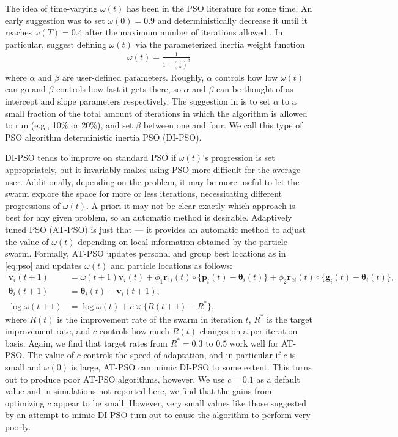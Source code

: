 \documentclass[12pt]{article}
\begin{document}
The idea of time-varying $\omega(t)$ has been in the PSO literature for some time. An early suggestion was to set $\omega(0)=0.9$ and deterministically decrease it until it reaches $\omega(T)=0.4$ after the maximum number of iterations allowed \citep{eberhart2000comparing}. In particular, \citet{tuppadung2011comparing} suggest defining $\omega(t)$ via the parameterized inertia weight function
\begin{align}\label{eq:inertiafun}
\omega(t) = \frac{1}{1 + \left(\frac{t}{\alpha}\right)^{\beta}}
\end{align}
where $\alpha$ and $\beta$ are user-defined parameters. Roughly, $\alpha$ controls how low $\omega(t)$ can go and $\beta$ controls how fast it gets there, so $\alpha$ and $\beta$ can be thought of as intercept and slope parameters respectively. The suggestion in \citet{tuppadung2011comparing} is to set $\alpha$ to a small fraction of the total amount of iterations in which the algorithm is allowed to run (e.g., 10\% or 20\%), and set $\beta$ between one and four. We call this type of PSO algorithm deterministic inertia PSO (DI-PSO).

DI-PSO tends to improve on standard PSO if $\omega(t)$'s progression is set appropriately, but it invariably makes using PSO more difficult for the average user. Additionally, depending on the problem, it may be more useful to let the swarm explore the space for more or less iterations, necessitating different progressions of $\omega(t)$. A priori it may not be clear exactly which approach is best for any given problem, so an automatic method is desirable. Adaptively tuned PSO (AT-PSO) is just that --- it provides an automatic method to adjust the value of $\omega(t)$ depending on local information obtained by the particle swarm. Formally, AT-PSO updates personal and group best locations as in \eqref{eq:pso} and updates $\omega(t)$ and particle locations as follows:
\begin{align}\label{eq:atpso}
\bm{v}_i(t+1) &= \omega(t+1) \bm{v}_i(t) + \phi_1 \bm{r}_{1i}(t)\circ\{\bm{p}_i(t) - \bm{\theta}_i(t)\} + \phi_2 \bm{r}_{2i}(t)\circ\{\bm{g}_i(t) - \bm{\theta}_i(t)\},\nonumber\\
\bm{\theta}_i(t+1) &= \bm{\theta}_i(t) + \bm{v}_i(t+1),\nonumber\\
\log\omega(t+1)& = \log\omega(t) + c\times\{R(t+1) - R^*\},
\end{align}
where $R(t)$ is the improvement rate of the swarm in iteration $t$, $R^*$ is the target improvement rate, and $c$ controls how much $R(t)$ changes on a per iteration basis. Again, we find that target rates from $R^*=0.3$ to $0.5$ work well for AT-PSO. The value of $c$ controls the speed of adaptation, and in particular if $c$ is small and $\omega(0)$ is large, AT-PSO can mimic DI-PSO to some extent. This turns out to produce poor AT-PSO algorithms, however. We use $c=0.1$ as a default value and in simulations not reported here, we find that the gains from optimizing $c$ appear to be small. However, very small values like those suggested by an attempt to mimic DI-PSO turn out to cause the algorithm to perform very poorly. 
\end{document}
